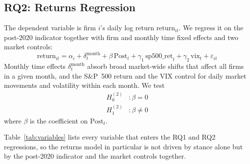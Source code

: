 \documentclass[conference]{IEEEtran}
\begin{document}
\subsection{RQ2: Returns Regression}
The dependent variable is firm $i$'s daily log return $\text{return}_{it}$. We regress it
on the post-2020 indicator together with firm and monthly time fixed effects and two
market controls:
\begin{equation}
\text{return}_{it} = \alpha_i + \delta_t^{\text{month}} + \beta\,\text{Post}_t + \gamma_1\,\text{sp500\_ret}_t + \gamma_2\,\text{vix}_t + \varepsilon_{it}
\label{eq:rq2}
\end{equation}
Monthly time effects $\delta_t^{\text{month}}$ absorb broad market-wide shifts that
affect all firms in a given month, and the S\&P~500 return and the VIX control for daily
market movements and volatility within each month. We test
\begin{align*}
H_0^{(2)}&: \beta = 0 \\
H_1^{(2)}&: \beta \neq 0
\end{align*}
where $\beta$ is the coefficient on $\text{Post}_t$.

Table~\ref{tab:variables} lists every variable that enters the RQ1 and RQ2 regressions,
so the returns model in particular is not driven by stance alone but by the post-2020
indicator and the market controls together.
\end{document}
